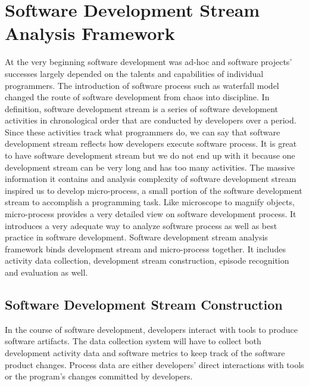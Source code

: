 \section{Software Development Stream Analysis Framework}
At the very beginning software development was ad-hoc and software
projects' successes largely depended on the talents and capabilities of
individual programmers. The introduction of software process such as
waterfall model changed the route of software development from chaos into
discipline. In definition, software development stream is a series of
software development activities in chronological order that are conducted
by developers over a period. Since these activities track what programmers
do, we can say that software development stream reflects how developers
execute software process. It is great to have software development stream
but we do not end up with it because one development stream can be very
long and has too many activities. The massive information it contains
and analysis complexity of software development stream inspired us to
develop micro-process, a small portion of the software development stream
to accomplish a programming task. Like microscope to magnify objects,
micro-process provides a very detailed view on software development
process. It introduces a very adequate way to analyze software process as
well as best practice in software development.  Software development stream
analysis framework binds development stream and micro-process together. It
includes activity data collection, development stream construction,
episode recognition and evaluation as well.

\subsection{Software Development Stream Construction}
In the course of software development, developers interact with tools to
produce software artifacts. The data collection system will have to collect
both development activity data and software metrics to keep track of the
software product changes. Process data are either developers' direct
interactions with tools or the program's changes committed by developers.

